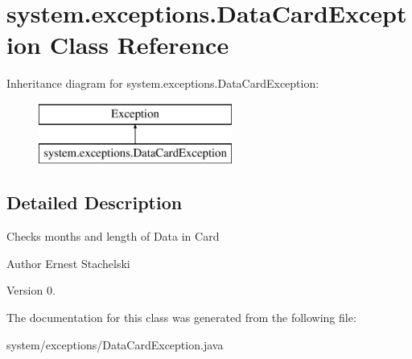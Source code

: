 \hypertarget{classsystem_1_1exceptions_1_1_data_card_exception}{}\section{system.\+exceptions.\+Data\+Card\+Exception Class Reference}
\label{classsystem_1_1exceptions_1_1_data_card_exception}
Inheritance diagram for system.\+exceptions.\+Data\+Card\+Exception\+:\begin{figure}[H]
\begin{center}
\leavevmode
\includegraphics[height=2.000000cm]{classsystem_1_1exceptions_1_1_data_card_exception}
\end{center}
\end{figure}


\subsection{Detailed Description}
Checks months and length of Data in Card \begin{DoxyAuthor}{Author}
Ernest Stachelski 
\end{DoxyAuthor}
\begin{DoxyVersion}{Version}
0. 
\end{DoxyVersion}


The documentation for this class was generated from the following file\+:\begin{DoxyCompactItemize}
\item 
system/exceptions/Data\+Card\+Exception.\+java\end{DoxyCompactItemize}
